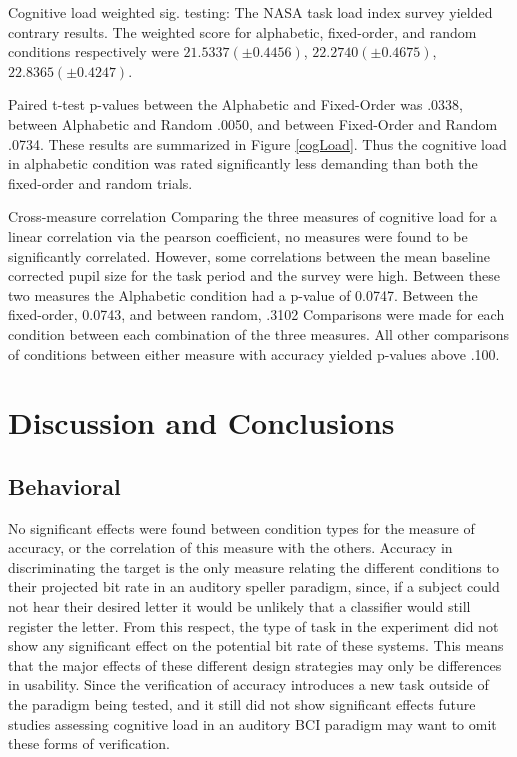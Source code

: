 \documentclass[10pt]{article}
\begin{document}
Cognitive load weighted sig. testing:
The NASA task load index survey yielded contrary results.  
The weighted score for alphabetic, fixed-order, and random
conditions respectively were 
$21.5337 (\pm 0.4456)$, $22.2740 (\pm 0.4675)$, $22.8365 (\pm
0.4247)$.

Paired t-test p-values between the Alphabetic and Fixed-Order was
.0338, between Alphabetic and Random .0050, and between Fixed-Order
and Random .0734.  These results are summarized in Figure
\ref{cogLoad}.  Thus the cognitive load in alphabetic condition was
rated significantly less demanding than both the fixed-order and
random trials.

Cross-measure correlation
Comparing the three measures of cognitive load for a linear
correlation via the pearson coefficient, no measures were found to
be significantly correlated. However, some correlations between the
mean baseline corrected pupil size for the task period and the survey were high.
Between these two measures the Alphabetic condition had a p-value
of 0.0747.  Between the fixed-order, 0.0743, and between random, .3102
Comparisons were made for each condition
between each combination of the three measures.  All other
comparisons of conditions between either measure with accuracy yielded
p-values above .100.

\section{Discussion and Conclusions}

\subsection{Behavioral}
No significant effects were found between condition types for the
measure of accuracy, or the correlation of this measure with the
others.  Accuracy in discriminating the target is the only measure
relating the different conditions to their projected bit rate in an
auditory speller paradigm, since, if a subject could not hear their desired
letter it would be unlikely that a classifier would still
register the letter. From this respect, the type of task in the
experiment did not show any significant effect on the potential bit rate of
these systems. This means that the major effects of these different
design strategies may only be differences in usability. Since the
verification of accuracy introduces a new task outside of the
paradigm being tested, and it still did not show significant effects
future studies assessing cognitive load in an auditory BCI paradigm
may want to omit these forms of verification.
\end{document}
